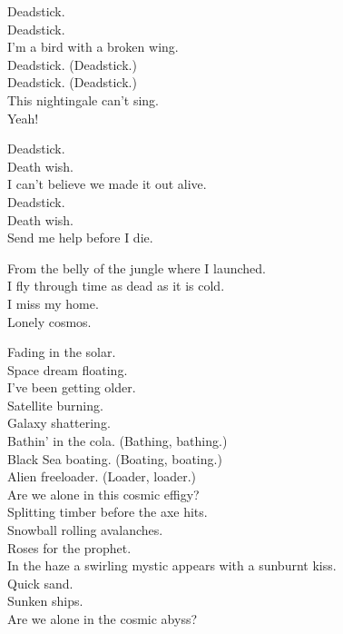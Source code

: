 
Deadstick. \\
Deadstick. \\
I'm a bird with a broken wing. \\
Deadstick. (Deadstick.) \\
Deadstick. (Deadstick.) \\
This nightingale can't sing. \\
Yeah! \\


Deadstick. \\
Death wish. \\
I can't believe we made it out alive. \\
Deadstick. \\
Death wish. \\
Send me help before I die. \\





From the belly of the jungle where I launched. \\
I fly through time as dead as it is cold. \\
I miss my home. \\
Lonely cosmos. \\


Fading in the solar. \\
Space dream floating. \\
I've been getting older. \\
Satellite burning. \\
Galaxy shattering. \\
Bathin' in the cola. (Bathing, bathing.) \\
Black Sea boating. (Boating, boating.) \\
Alien freeloader. (Loader, loader.) \\
Are we alone in this cosmic effigy? \\

Splitting timber before the axe hits. \\
Snowball rolling avalanches. \\
Roses for the prophet. \\
In the haze a swirling mystic appears with a sunburnt kiss. \\
Quick sand. \\
Sunken ships. \\
Are we alone in the cosmic abyss? \\

